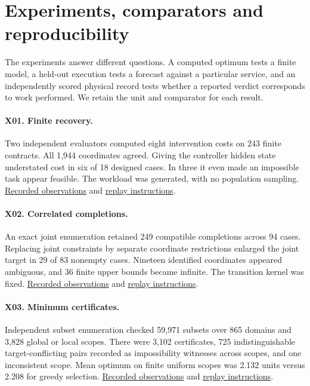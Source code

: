\section{Experiments, comparators and reproducibility}\label{app:experiments}
\begingroup\setlength{\emergencystretch}{2em}

The experiments answer different questions. A computed optimum tests a finite model, a held-out execution tests a forecast against a particular service, and an independently scored physical record tests whether a reported verdict corresponds to work performed. We retain the unit and comparator for each result.

\paragraph{X01. Finite recovery.} Two independent evaluators computed eight intervention costs on 243 finite contracts. All 1,944 coordinates agreed. Giving the controller hidden state understated cost in six of 18 designed cases. In three it even made an impossible task appear feasible. The workload was generated, with no population sampling. \href{https://github.com/Perceptive-Closure/PC-X/blob/a52d45f1b8c0036b1a69b1fc024f95e48d4ce012/EXPERIMENTS/EXP-X01/results/summary.json}{Recorded observations} and \href{https://github.com/Perceptive-Closure/PC-X/blob/a52d45f1b8c0036b1a69b1fc024f95e48d4ce012/EXPERIMENTS/EXP-X01/README.md}{replay instructions}.

\paragraph{X02. Correlated completions.} An exact joint enumeration retained 249 compatible completions across 94 cases. Replacing joint constraints by separate coordinate restrictions enlarged the joint target in 29 of 83 nonempty cases. Nineteen identified coordinates appeared ambiguous, and 36 finite upper bounds became infinite. The transition kernel was fixed. \href{https://github.com/Perceptive-Closure/PC-X/blob/18bc904d7073df3536d9794f18b868b9a3de53bc/EXPERIMENTS/EXP-X02/results/summary.json}{Recorded observations} and \href{https://github.com/Perceptive-Closure/PC-X/blob/18bc904d7073df3536d9794f18b868b9a3de53bc/EXPERIMENTS/EXP-X02/README.md}{replay instructions}.

\paragraph{X03. Minimum certificates.} Independent subset enumeration checked 59,971 subsets over 865 domains and 3,828 global or local scopes. There were 3,102 certificates, 725 indistinguishable target-conflicting pairs recorded as impossibility witnesses across scopes, and one inconsistent scope. Mean optimum on finite uniform scopes was 2.132 units versus 2.208 for greedy selection. \href{https://github.com/Perceptive-Closure/PC-X/blob/d85fe1cdb76cbc6d03e58e34f320c4c58a3f243c/EXPERIMENTS/EXP-X03/results/scopes.csv}{Recorded observations} and \href{https://github.com/Perceptive-Closure/PC-X/blob/d85fe1cdb76cbc6d03e58e34f320c4c58a3f243c/EXPERIMENTS/EXP-X03/README.md}{replay instructions}.

